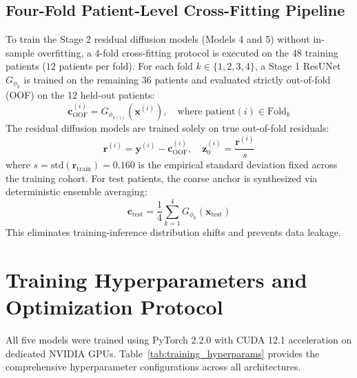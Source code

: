\subsection{Four-Fold Patient-Level Cross-Fitting Pipeline}
To train the Stage 2 residual diffusion models (Models 4 and 5) without in-sample overfitting, a 4-fold cross-fitting protocol is executed on the 48 training patients ($12$ patients per fold). For each fold $k \in \{1, 2, 3, 4\}$, a Stage 1 ResUNet $G_{\phi_k}$ is trained on the remaining 36 patients and evaluated strictly out-of-fold (OOF) on the 12 held-out patients:
\begin{equation}
\mathbf{c}_{\text{OOF}}^{(i)} = G_{\phi_{k(i)}}\left(\mathbf{x}^{(i)}\right), \quad \text{where } \text{patient}(i) \in \text{Fold}_k
\label{eq:oof_prediction}
\end{equation}
The residual diffusion models are trained solely on true out-of-fold residuals:
\begin{equation}
\mathbf{r}^{(i)} = \mathbf{y}^{(i)} - \mathbf{c}_{\text{OOF}}^{(i)}, \quad \mathbf{z}_0^{(i)} = \frac{\mathbf{r}^{(i)}}{s}
\label{eq:residual_scaling}
\end{equation}
where $s = \text{std}(\mathbf{r}_{\text{train}}) = 0.160$ is the empirical standard deviation fixed across the training cohort. For test patients, the coarse anchor is synthesized via deterministic ensemble averaging:
\begin{equation}
\mathbf{c}_{\text{test}} = \frac{1}{4} \sum_{k=1}^4 G_{\phi_k}(\mathbf{x}_{\text{test}})
\label{eq:test_ensemble_coarse}
\end{equation}
This eliminates training-inference distribution shifts and prevents data leakage.

\section{Training Hyperparameters and Optimization Protocol}
All five models were trained using PyTorch 2.2.0 with CUDA 12.1 acceleration on dedicated NVIDIA GPUs. Table~\ref{tab:training_hyperparams} provides the comprehensive hyperparameter configurations across all architectures.

